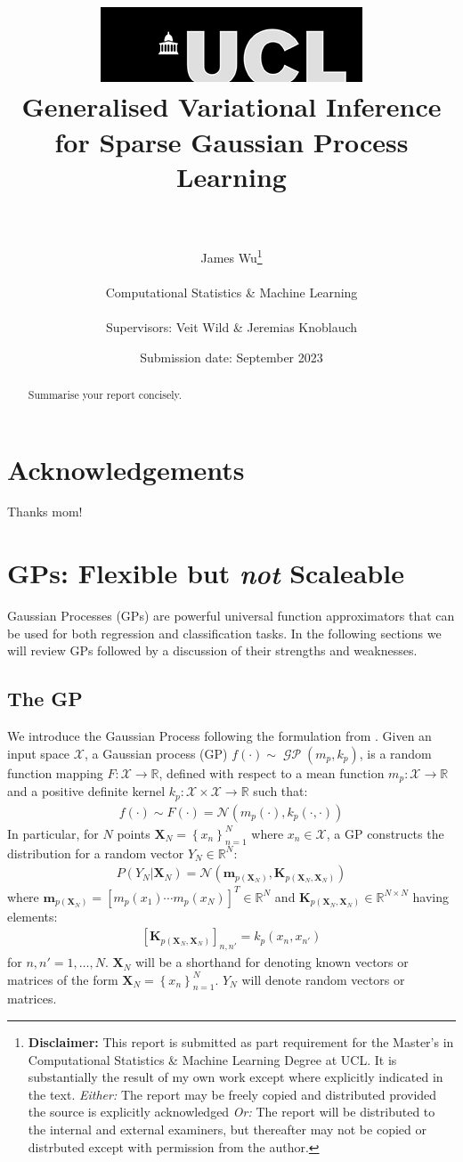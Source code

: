 \documentclass{article}
\title{  	{ \includegraphics[scale=.5]{ucl_logo.png}}\\
{{\Huge Generalised Variational Inference for Sparse Gaussian Process Learning}}\\
{\large }\\
		}
\date{Submission date: September 2023}
\author{James Wu\thanks{
{\bf Disclaimer:}
This report is submitted as part requirement for the Master's in Computational Statistics \& Machine Learning Degree at UCL. It is
substantially the result of my own work except where explicitly indicated in the text.
\newline  %
\emph{Either: }The report may be freely copied and distributed provided the source is explicitly acknowledged
\newline  %
\emph{Or: }The report will be distributed to the internal and external examiners, but thereafter may not be copied or distrbuted except with permission from the author.}
\\ \\
Computational Statistics \& Machine Learning\\ \\
Supervisors: Veit Wild \& Jeremias Knoblauch}
\newcommand{\GP}{\operatorname{\mathcal{GP}}}
\numberwithin{equation}{section}
\begin{document}
\onehalfspacing
\maketitle
{}
\newpage
\setcounter{page}{1}
\section*{Acknowledgements}
Thanks mom!
\newpage

\begin{abstract}
Summarise your report concisely.
\end{abstract}
\newpage
\tableofcontents
\newpage
{}
\setcounter{page}{1}
\section{GPs: Flexible but \textit{not} Scaleable}
Gaussian Processes (GPs) are powerful universal function approximators that can be used for both regression and classification tasks. In the following sections we will review GPs followed by a discussion of their strengths and weaknesses.
\subsection{The GP}
We introduce the Gaussian Process following the formulation from \cite{rasmussen2003gaussian}. Given an input space $\mathcal{X}$, a Gaussian process (GP) $f(\cdot) \sim \GP(m_p, k_p)$, is a random function mapping $F: \mathcal{X} \rightarrow \mathbb{R}$, defined with respect to a mean function $m_p: \mathcal{X} \rightarrow \mathbb{R}$ and a positive definite kernel $k_p: \mathcal{X} \times \mathcal{X} \rightarrow \mathbb{R}$ such that:
\begin{align}
    f(\cdot) \sim F(\cdot) = \mathcal{N}(m_p(\cdot), k_p(\cdot, \cdot))
    \label{gp}
\end{align}
In particular, for $N$ points $\mathbf{X}_N = \left\{ x_n\right\}_{n=1}^N$ where $x_n \in \mathcal{X}$, a GP constructs the distribution for a random vector $Y_N \in \mathbb{R}^{N}$:
\begin{align}
    \label{gp-vector}
    P\left(Y_N \vert \mathbf{X}_N\right) = \mathcal{N}\left(\mathbf{m}_{p\left(\mathbf{X}_N\right)}, \mathbf{K}_{p\left(\mathbf{X}_N, \mathbf{X}_N\right)}\right)
\end{align}
where $\mathbf{m}_{p(\mathbf{X}_N)} = \left[ m_p(x_1) \cdots m_p(x_N)\right]^T \in \mathbb{R}^N$ and $\mathbf{K}_{p(\mathbf{X}_N, \mathbf{X}_N)} \in \mathbb{R}^{N \times N}$ having elements:
\begin{align}
    \left[\mathbf{K}_{p(\mathbf{X}_N, \mathbf{X}_N)}\right]_{n, n'} = k_p(x_n, x_{n'})
\end{align}
for $n, n'=1,\dots, N$. $\mathbf{X}_N$ will be a shorthand for denoting known vectors or matrices of the form $\mathbf{X}_N = \left\{ x_n\right\}_{n=1}^N$. $Y_N$ will denote random vectors or matrices.
\end{document}

